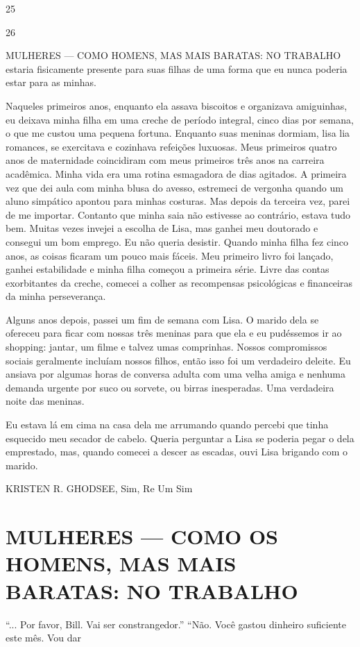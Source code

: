  \par 
25
 \par 
26
 \par 
MULHERES — COMO HOMENS, MAS MAIS BARATAS: NO TRABALHO estaria fisicamente presente para suas filhas de uma forma que eu nunca poderia estar para as minhas.
 \par 
Naqueles primeiros anos, enquanto ela assava biscoitos e organizava amiguinhas, eu deixava minha filha em uma creche de período integral, cinco dias por semana, o que me custou uma pequena fortuna. Enquanto suas meninas dormiam, lisa lia romances, se exercitava e cozinhava refeições luxuosas. Meus primeiros quatro anos de maternidade coincidiram com meus primeiros três anos na carreira acadêmica. Minha vida era uma rotina esmagadora de dias agitados. A primeira vez que dei aula com minha blusa do avesso, estremeci de vergonha quando um aluno simpático apontou para minhas costuras. Mas depois da terceira vez, parei de me importar. Contanto que minha saia não estivesse ao contrário, estava tudo bem. Muitas vezes invejei a escolha de Lisa, mas ganhei meu doutorado e consegui um bom emprego. Eu não queria desistir. Quando minha filha fez cinco anos, as coisas ficaram um pouco mais fáceis. Meu primeiro livro foi lançado, ganhei estabilidade e minha filha começou a primeira série. Livre das contas exorbitantes da creche, comecei a colher as recompensas psicológicas e financeiras da minha perseverança.
 \par 
Alguns anos depois, passei um fim de semana com Lisa. O marido dela se ofereceu para ficar com nossas três meninas para que ela e eu pudéssemos ir ao shopping: jantar, um filme e talvez umas comprinhas. Nossos compromissos sociais geralmente incluíam nossos filhos, então isso foi um verdadeiro deleite. Eu ansiava por algumas horas de conversa adulta com uma velha amiga e nenhuma demanda urgente por suco ou sorvete, ou birras inesperadas. Uma verdadeira noite das meninas.
 \par 
Eu estava lá em cima na casa dela me arrumando quando percebi que tinha esquecido meu secador de cabelo. Queria perguntar a Lisa se poderia pegar o dela emprestado, mas, quando comecei a descer as escadas, ouvi Lisa brigando com o marido.
 \par 
KRISTEN R. GHODSEE, Sim, Re Um Sim
 \par 
\chapter{MULHERES — COMO OS HOMENS, MAS MAIS BARATAS: NO TRABALHO}\label{MULHERES — COMO OS HOMENS, MAS MAIS BARATAS: NO TRABALHO}
 \par 
“... Por favor, Bill. Vai ser constrangedor.” “Não. Você gastou dinheiro suficiente este mês. Vou dar
 \par 
